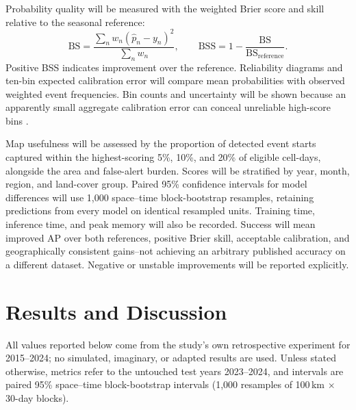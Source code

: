 \documentclass[pdflatex,sn-mathphys-num]{sn-jnl}
\begin{document}
Probability quality will be measured with the weighted Brier score and skill relative to the seasonal reference:
\begin{equation}
\mathrm{BS}=\frac{\sum_n w_n(\hat p_n-y_n)^2}{\sum_n w_n},\qquad
\mathrm{BSS}=1-\frac{\mathrm{BS}}{\mathrm{BS}_{\mathrm{reference}}}.
\end{equation}
Positive BSS indicates improvement over the reference. Reliability diagrams and ten-bin expected calibration error will compare mean probabilities with observed weighted event frequencies. Bin counts and uncertainty will be shown because an apparently small aggregate calibration error can conceal unreliable high-score bins \cite{choi2026burnedarea,jadouli2026physics}.

Map usefulness will be assessed by the proportion of detected event starts captured within the highest-scoring 5\%, 10\%, and 20\% of eligible cell-days, alongside the area and false-alert burden. Scores will be stratified by year, month, region, and land-cover group. Paired 95\% confidence intervals for model differences will use 1,000 space--time block-bootstrap resamples, retaining predictions from every model on identical resampled units. Training time, inference time, and peak memory will also be recorded. Success will mean improved AP over both references, positive Brier skill, acceptable calibration, and geographically consistent gains--not achieving an arbitrary published accuracy on a different dataset. Negative or unstable improvements will be reported explicitly.


\section{Results and Discussion}\label{sec:results}

All values reported below come from the study's own retrospective experiment for 2015--2024; no simulated, imaginary, or adapted results are used. Unless stated otherwise, metrics refer to the untouched test years 2023--2024, and intervals are paired 95\% space--time block-bootstrap intervals (1,000 resamples of 100\,km $\times$ 30-day blocks).
\end{document}
